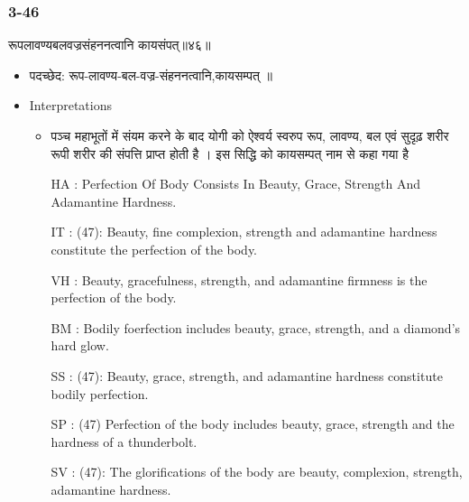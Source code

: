 \begin{frame}[fragile]\frametitle{3-46}
\begin{sanskrit}
रूपलावण्यबलवज्रसंहननत्वानि कायसंपत्॥४६॥
\end{sanskrit}

	\begin{itemize}
	\item पदच्छेद:  रूप-लावण्य-बल-वज्र-संहननत्वानि,कायसम्पत् ॥
	\item Interpretations
		\begin{itemize}	
		\item पञ्च महाभूतों में संयम करने के बाद योगी को ऐश्वर्य स्वरुप रूप, लावण्य, बल एवं सुदृढ़ शरीर रूपी शरीर की संपत्ति प्राप्त होती है । इस सिद्धि को कायसम्पत् नाम से कहा गया है
		\item [HA]: Perfection Of Body Consists In Beauty, Grace, Strength And Adamantine Hardness.
		\item [IT]: (47): Beauty, fine complexion, strength and adamantine hardness constitute the perfection of the body.
		\item [VH]: Beauty, gracefulness, strength, and adamantine firmness is the perfection of the body.
		\item [BM]: Bodily foerfection includes beauty, grace, strength, and a diamond’s hard glow.
		\item [SS]: (47): Beauty, grace, strength, and adamantine hardness constitute bodily perfection.
		\item [SP]: (47) Perfection of the body includes beauty, grace, strength and the hardness of a thunderbolt.
		\item [SV]: (47): The glorifications of the body are beauty, complexion, strength, adamantine hardness. 
		\end{itemize}
	\end{itemize}
\end{frame}



